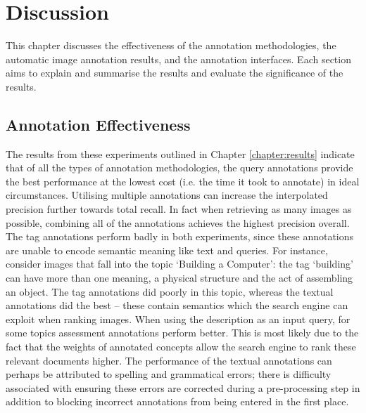 \chapter{Discussion}

This chapter discusses the effectiveness of the annotation methodologies, the automatic image annotation results, and the annotation interfaces. Each section aims to explain and summarise the results and evaluate the significance of the results.

\section{Annotation Effectiveness}

The results from these experiments outlined in Chapter \ref{chapter:results} indicate that of all the types of annotation methodologies, the query annotations provide the best performance at the lowest cost (i.e. the time it took to annotate) in ideal circumstances. Utilising multiple annotations can increase the interpolated precision further towards total recall. In fact when retrieving as many images as possible, combining all of the annotations achieves the highest precision overall. The tag annotations perform badly in both experiments, since these annotations are unable to encode semantic meaning like text and queries. For instance, consider images that fall into the topic `Building a Computer': the tag `building' can have more than one meaning, a physical structure and the act of assembling an object. The tag annotations did poorly in this topic, whereas the textual annotations did the best -- these contain semantics which the search engine can exploit when ranking images. When using the description as an input query, for some topics assessment annotations perform better. This is most likely due to the fact that the weights of annotated concepts allow the search engine to rank these relevant documents higher. The performance of the textual annotations can perhaps be attributed to spelling and grammatical errors; there is difficulty associated with ensuring these errors are corrected during a pre-processing step in addition to blocking incorrect annotations from being entered in the first place.

